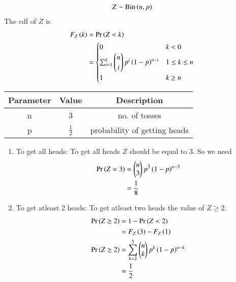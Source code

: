 \documentclass[journal,12pt,twocolumn]{IEEEtran}
\theoremstyle{remark}
\begin{document}
\begin{align}
Z \sim \text{Bin}\left(n,p\right)\\
\end{align}
The cdf of $Z$ is
\begin{align}
F_Z\left(k\right) &= \Pr\left(Z < k\right)\\
&=
\begin{cases}
0 & k < 0 \\
\sum_{i=1}^{k}\begin{pmatrix}n\\i\end{pmatrix}p^i\left(1-p\right)^{n-i} & 1 \leq k \leq n\\
1 & k \geq n
\end{cases}
\end{align}
\begin{center}
\begin{tabular}{ |c|c|c| } 
 \hline
 Parameter & Value & Description \\ 
 \hline
 n & 3 & no. of tosses \\ 
 \hline
 p & $\frac{1}{2}$ & probability of getting heads \\ 
 \hline
\end{tabular}
\end{center}
\begin{enumerate}
\item To get all heads: 
To get all heads $Z$ should be equal to 3. So we need 
\begin{align}
\Pr\left(Z=3\right) &= \begin{pmatrix}n\\3\end{pmatrix}p^3\left(1-p\right)^{n-3}\\
&= \frac{1}{8}
\end{align}
\item To get atleast 2 heads: 
To get atleast two heads the value of $Z \geq 2$.
\begin{align}
\Pr\left(Z \geq 2\right) &= 1 - \Pr\left(Z<2\right)\\
&= F_Z\left(3\right) - F_Z\left(1\right)\\
\Pr\left(Z \geq 2\right) &= \sum_{k=2}^3\begin{pmatrix}n\\k\end{pmatrix}p^k\left(1-p\right)^{n-k}\\
&= \frac{1}{2}
\end{align}
\end{enumerate}
\end{document}
